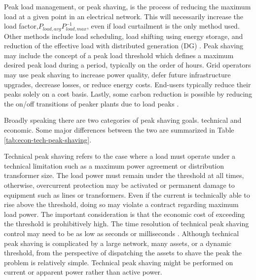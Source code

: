 \documentclass[journal,article,submit,pdftex,moreauthors]{Definitions/mdpi}
\begin{document}
Peak load management, or peak shaving, is the process of reducing the maximum load at a given point in an electrical network. This will necessarily increase the load factor,$P_{load,avg} P_{load,max}^{-1}$, even if load curtailment is the only method used. Other methods include load scheduling, load shifting using energy storage, and reduction of the effective load with distributed generation (DG) \cite{Uddin2018}. Peak shaving may include the concept of a peak load threshold which defines a maximum desired peak load during a period, typically on the order of hours. Grid operators may use peak shaving to increase power quality, defer future infrastructure upgrades, decrease losses, or reduce energy costs. End-users typically reduce their peaks solely on a cost basis. Lastly, some carbon reduction is possible by reducing the on/off transitions of peaker plants due to load peaks \cite{Uddin2018}.

Broadly speaking there are two categories of peak shaving goals. technical and economic. Some major differences between the two are summarized in Table \ref{tab:econ-tech-peak-shaving}.



Technical peak shaving refers to the case where a load must operate under a technical limitation such as a maximum power agreement or distribution transformer size. The load power must remain under the threshold at all times, otherwise, overcurrent protection may be activated or permanent damage to equipment such as lines or transformers. Even if the current is technically able to rise above the threshold, doing so may violate a contract regarding maximum load power. The important consideration is that the economic cost of exceeding the threshold is prohibitively high. The time resolution of technical peak shaving control may need to be as low as seconds or milliseconds \cite{Iannarelli2020}. Although technical peak shaving is complicated by a large network, many assets, or a dynamic threshold, from the perspective of dispatching the assets to shave the peak the problem is relatively simple. Technical peak shaving might be performed on current or apparent power rather than active power.
\end{document}
